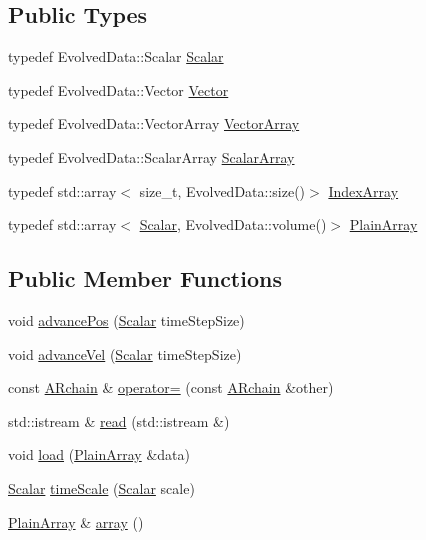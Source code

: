 \subsection*{Public Types}
\begin{DoxyCompactItemize}
\item 
typedef Evolved\+Data\+::\+Scalar \mbox{\hyperlink{class_a_rchain_a707e42a79e4744424a34c9007e84ee07}{Scalar}}
\item 
typedef Evolved\+Data\+::\+Vector \mbox{\hyperlink{class_a_rchain_ab9b518a463f750eb54e002842b66e8dd}{Vector}}
\item 
typedef Evolved\+Data\+::\+Vector\+Array \mbox{\hyperlink{class_a_rchain_a019fbadb9f4e5892736d9127537338bb}{Vector\+Array}}
\item 
typedef Evolved\+Data\+::\+Scalar\+Array \mbox{\hyperlink{class_a_rchain_a206c7f2ff7ce15041a20d327d28b7be3}{Scalar\+Array}}
\item 
typedef std\+::array$<$ size\+\_\+t, Evolved\+Data\+::size()$>$ \mbox{\hyperlink{class_a_rchain_aae40d4b5881eecfc960814f9e368215d}{Index\+Array}}
\item 
typedef std\+::array$<$ \mbox{\hyperlink{class_a_rchain_a707e42a79e4744424a34c9007e84ee07}{Scalar}}, Evolved\+Data\+::volume()$>$ \mbox{\hyperlink{class_a_rchain_a829aca51411c08ffd518294770a374d5}{Plain\+Array}}
\end{DoxyCompactItemize}
\subsection*{Public Member Functions}
\begin{DoxyCompactItemize}
\item 
void \mbox{\hyperlink{class_a_rchain_a8d3ac75a6b4231e0859492257553316e}{advance\+Pos}} (\mbox{\hyperlink{class_a_rchain_a707e42a79e4744424a34c9007e84ee07}{Scalar}} time\+Step\+Size)
\item 
void \mbox{\hyperlink{class_a_rchain_a6a76ab7a095adfbf4a69226a31d866d4}{advance\+Vel}} (\mbox{\hyperlink{class_a_rchain_a707e42a79e4744424a34c9007e84ee07}{Scalar}} time\+Step\+Size)
\item 
const \mbox{\hyperlink{class_a_rchain}{A\+Rchain}} \& \mbox{\hyperlink{class_a_rchain_a7bcc783f99cad1e9113d2b505544aba1}{operator=}} (const \mbox{\hyperlink{class_a_rchain}{A\+Rchain}} \&other)
\item 
std\+::istream \& \mbox{\hyperlink{class_a_rchain_a86bd89bacf59c9c3bb0594499db82e04}{read}} (std\+::istream \&)
\item 
void \mbox{\hyperlink{class_a_rchain_a7edf1240a094d55df222c816659dced0}{load}} (\mbox{\hyperlink{class_a_rchain_a829aca51411c08ffd518294770a374d5}{Plain\+Array}} \&data)
\item 
\mbox{\hyperlink{class_a_rchain_a707e42a79e4744424a34c9007e84ee07}{Scalar}} \mbox{\hyperlink{class_a_rchain_a979a40abd086aeb411dc8e82a3bb1cdf}{time\+Scale}} (\mbox{\hyperlink{class_a_rchain_a707e42a79e4744424a34c9007e84ee07}{Scalar}} scale)
\item 
\mbox{\hyperlink{class_a_rchain_a829aca51411c08ffd518294770a374d5}{Plain\+Array}} \& \mbox{\hyperlink{class_a_rchain_aeb4d9b0a28ae3b4e4286edf838e5a905}{array}} ()
\end{DoxyCompactItemize}
